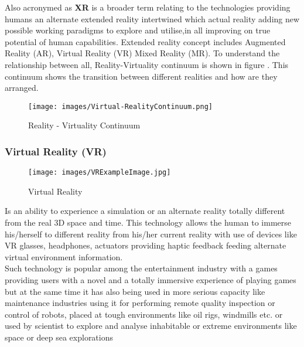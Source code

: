 \documentclass{article}
\begin{document}
Also acronymed as \textbf{XR} is a broader term relating to the technologies providing humans an alternate extended reality intertwined which actual reality adding new possible working paradigms to explore and utilise,in all improving on true potential of human capabilities.
Extended reality concept includes Augmented Reality (AR), Virtual Reality (VR) Mixed Reality (MR). To understand the relationship between all, Reality-Virtuality continuum is shown in figure . This continuum shows the transition between different realities and how are they arranged. \cite{reality-VirualContinuum}\\


\begin{figure}[htp]
    \centering
    \texttt{[image: images/Virtual-RealityContinuum.png]}
    \caption{Reality - Virtuality Continuum}
    
    \author{Jack Liu}
    \label{fig: V-RContinuum}
\end{figure}


\subsubsection{Virtual Reality (VR)}

\begin{figure}[htp]
    \centering
    \texttt{[image: images/VRExampleImage.jpg]}
    \caption{Virtual Reality }
    
    \author{J. M. Eddins Jr/US Air Force}
    \label{fig: vRExample}
\end{figure}

Is an ability to experience a simulation or an alternate reality totally different from the real 3D space and time. This technology allows the human to immerse his/herself to different reality from his/her current reality with use of devices like VR glasses, headphones, actuators providing haptic feedback feeding alternate virtual environment information.\\



Such technology is popular among the entertainment industry with a games providing users with a novel and a totally immersive experience of playing games but at the same time it has also being used in more serious capacity like maintenance industries using it for performing remote quality inspection or control of robots, placed at tough environments like oil rigs, windmills etc. or used by scientist to explore and analyse inhabitable or extreme environments like space or deep sea explorations \cite{spaceAR} 
\end{document}

